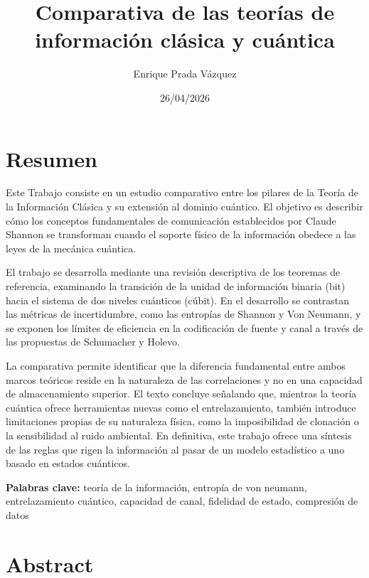 \documentclass[11pt,a4paper,spanish]{book}
\title{Comparativa de las teorías de información clásica y cuántica}
\author{Enrique Prada Vázquez}
\date{26/04/2026}
\begin{document}
\renewcommand{\listfigurename}{Índice de figuras}
\renewcommand{\listtablename}{Índice de tablas}
\renewcommand{\contentsname}{Índice de contenidos}
\renewcommand{\figurename}{Figura}
\renewcommand{\tablename}{Tabla} 

\maketitle
\frontmatter
\tableofcontents

\chapter{Resumen}

Este Trabajo consiste en un estudio comparativo entre los pilares de la Teoría de la Información Clásica y su extensión al dominio cuántico. El objetivo es describir cómo los conceptos fundamentales de comunicación establecidos por Claude Shannon se transforman cuando el soporte físico de la información obedece a las leyes de la mecánica cuántica.

El trabajo se desarrolla mediante una revisión descriptiva de los teoremas de referencia, examinando la transición de la unidad de información binaria (bit) hacia el sistema de dos niveles cuánticos (cúbit). En el desarrollo se contrastan las métricas de incertidumbre, como las entropías de Shannon y Von Neumann, y se exponen los límites de eficiencia en la codificación de fuente y canal a través de las propuestas de Schumacher y Holevo.

La comparativa permite identificar que la diferencia fundamental entre ambos marcos teóricos reside en la naturaleza de las correlaciones y no en una capacidad de almacenamiento superior. El texto concluye señalando que, mientras la teoría cuántica ofrece herramientas nuevas como el entrelazamiento, también introduce limitaciones propias de su naturaleza física, como la imposibilidad de clonación o la sensibilidad al ruido ambiental. En definitiva, este trabajo ofrece una síntesis de las reglas que rigen la información al pasar de un modelo estadístico a uno basado en estados cuánticos.

\vspace{0.5cm}
{\bf Palabras clave:} teoría de la información, entropía de von neumann, entrelazamiento cuántico, capacidad de canal, fidelidad de estado, compresión de datos

\chapter{Abstract}
\end{document}
